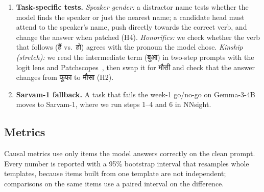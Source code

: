 \documentclass[11pt,a4paper]{article}
\newcommand{\hi}[1]{{\devfont #1}}
\begin{document}
\begin{enumerate}[leftmargin=1.4em,itemsep=0.35em]
  \item \textbf{Task-specific tests.} \emph{Speaker gender:} a distractor name tests whether the model finds the speaker or just the nearest name; a candidate head must attend to the speaker's name, push directly towards the correct verb, and change the answer when patched (H4). \emph{Honorifics:} we check whether the verb that follows (\hi{हैं} vs.\ \hi{हो}) agrees with the pronoun the model chose. \emph{Kinship (stretch):} we read the intermediate term (\hi{बुआ}) in two-step prompts with the logit lens and Patchscopes~\cite{patchscopes2024}, then swap it for \hi{मौसी} and check that the answer changes from \hi{फूफा} to \hi{मौसा} (H2).
  \item \textbf{Sarvam-1 fallback.} A task that fails the week-1 go/no-go on Gemma-3-4B moves to Sarvam-1, where we run steps 1--4 and 6 in NNsight.
\end{enumerate}

\subsection{Metrics}

Causal metrics use only items the model answers correctly on the clean prompt. Every number is reported with a 95\% bootstrap interval that resamples whole templates, because items built from one template are not independent; comparisons on the same items use a paired interval on the difference.
\end{document}
